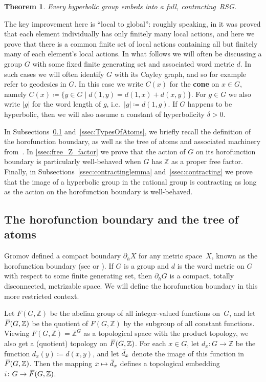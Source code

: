 \documentclass[11pt,letterpaper]{amsart}
\newtheorem{theorem}{Theorem}[section]
\theoremstyle{definition}
\newcommand{\newword}[1]{\textbf{#1}}
\newcommand{\Z}{\mathbb{Z}}
\newcommand{\oF}{\mkern 3.75mu\overline{\mkern-3.75mu F}}
\newcommand{\od}{\mkern 3mu\overline{\mkern-3mu d\mkern 1.5mu}\mkern-1.5mu}
\begin{document}
\begin{theorem}\label{thrm:hyp_to_contracting}
Every hyperbolic group embeds into a full, contracting~RSG.
\end{theorem}

The key improvement here is ``local to global'': roughly speaking, in \cite{BelkBleakMatucci} it was proved that each element individually has only finitely many local actions, and here we prove that there is a common finite set of local actions containing all but finitely many of each element's local actions. In what follows we will often be discussing a group $G$ with some fixed finite generating set and associated word metric $d$.  In such cases we will often identify $G$ with its Cayley graph, and so for example refer to geodesics in $G$.  In this case we write $C(x)$ for the \newword{cone} on $x\in G$, namely $C(x)\coloneqq\{y\in G\mid d(1,y)=d(1,x)+d(x,y)\}$. For $g\in G$ we also write $|g|$ for the word length of $g$, i.e.\ $|g|\coloneqq d(1,g)$.  If $G$ happens to be hyperbolic, then we will also assume a constant of hyperbolicity $\delta>0$.  

In Subsections~\ref{ssec:horofunction} and~\ref{ssec:TypesOfAtoms}, we briefly recall the definition of the horofunction boundary, as well as the tree of atoms and associated machinery from~\cite{BelkBleakMatucci}. In \cref{ssec:free_Z_factor} we prove that the action of $G$ on its horofunction boundary is particularly well-behaved when $G$ has $\Z$ as a proper free factor. Finally, in Subsections~\ref{ssec:contractinglemma} and~\ref{ssec:contracting} we prove that the image of a hyperbolic group in the rational group is contracting as long as the action on the horofunction boundary is well-behaved.


\subsection{The horofunction boundary and the tree of atoms}\label{ssec:horofunction}

Gromov defined a compact boundary $\partial_h X$ for any metric space~$X$, known as the horofunction boundary (see \cite[Section~7.5]{Gromov1987} or \cite[Chapter~II.8]{BrHa}). If $G$ is a group and $d$ is the word metric on $G$ with respect to some finite generating set, then $\partial_h G$ is a compact, totally disconnected, metrizable space. We will define the horofunction boundary in this more restricted context.

Let $F(G,\Z)$ be the abelian group of all integer-valued functions on~$G$, and let $\oF(G,\Z)$ be the quotient of $F(G,\Z)$ by the subgroup of all constant functions. Viewing $F(G,\Z)=\Z^G$ as a topological space with the product topology, we also get a (quotient) topology on $\oF(G,\Z)$.  For each $x\in G$, let $d_x\colon G\to\Z$ be the function $d_x(y)\coloneqq d(x,y)$, and let $\od_x$ denote the image of this function in $\oF(G,\Z)$.  Then the mapping $x\mapsto \od_x$ defines a topological embedding $i\colon G \to \oF(G,\Z)$.
\end{document}
